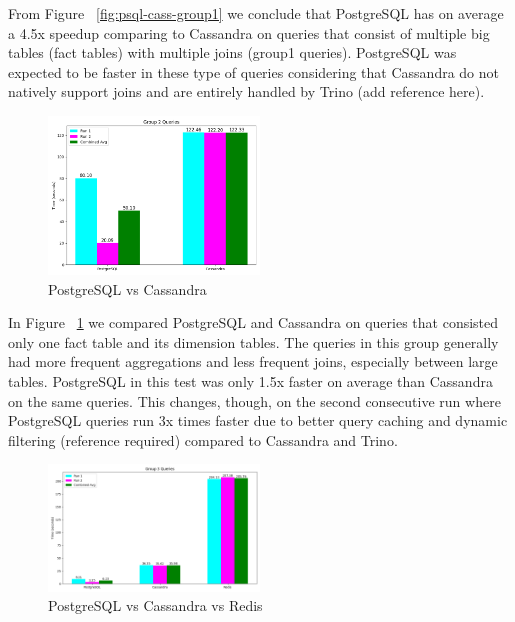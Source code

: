 \documentclass[conference]{IEEEtran}
\begin{document}
From Figure ~\ref{fig:psql-cass-group1} we conclude that PostgreSQL has on average a 4.5x speedup comparing to Cassandra on queries that consist of multiple big tables (fact tables) with multiple joins (group1 queries). PostgreSQL was expected to be faster in these type of queries considering that Cassandra do not natively support joins and are entirely handled by Trino (add reference here).

\begin{figure}[h]
	\centering
	\includegraphics[width=0.5\textwidth]{images/DBs_bench_no_distro/group2.png}
	\caption{PostgreSQL vs Cassandra}
	\label{fig:psql-cass-group2}
\end{figure}

In Figure ~\ref{fig:psql-cass-group2} we compared PostgreSQL and Cassandra on queries that consisted only one fact table and its dimension tables. The queries in this group generally had more frequent aggregations and less frequent joins, especially between large tables. PostgreSQL in this test was only 1.5x faster on average than Cassandra on the same queries. This changes, though, on the second consecutive run where PostgreSQL queries run 3x times faster due to better query caching and dynamic filtering (reference required) compared to Cassandra and Trino.

\begin{figure}[h]
	\centering
	\includegraphics[width=0.5\textwidth]{images/DBs_bench_no_distro/group3.png}
	\caption{PostgreSQL vs Cassandra vs Redis}
	\label{fig:psql-cass-redis-group3}
\end{figure}
\end{document}
